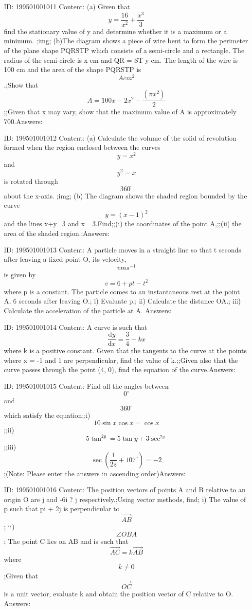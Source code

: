 \documentclass{article}
\begin{document}
ID: 199501001011
Content:
(a) Given that\[y = \frac{16}{x^{2}} + \frac{x^{3}}{3}\] find the stationary value of y and determine whether it is a maximum or a minimum. ;img; (b)The diagram shows a piece of wire bent to form the perimeter of the plane shape PQRSTP which consists of a semi-circle and a rectangle. The radius of the semi-circle is x cm and QR = ST  y cm. The length of the wire is 100 cm and the area of the shape PQRSTP is \[A cm^{2}\].;Show that \[A = 100x-2x^{2}-\frac{\left ( \pi x^{2} \right )}{2}\];;Given that x may vary, show that the maximum value of A is approximately 700.Answers:

ID: 199501001012
Content:
(a)	Calculate the volume of the solid of revolution formed when the region enclosed between the curves \[y = x^{2}\] and \[y^{2}=x\]  is rotated through \[360^{\circ}\]  about the x-axis. ;img; (b) The diagram shows the shaded region bounded by the curve\[y = \left ( x-1 \right )^{2}\] and the lines x+y=3 and x =3.Find;;(i) the coordinates of the point A,;;(ii) the area of the shaded region.;Answers:

ID: 199501001013
Content:
A particle moves in a straight line so that t seconds after leaving a fixed point O, its velocity, \[v ms^{-1}\] is given by \[v=6+pt-t^{2}\] where p is a constant. The particle comes to an instantaneous rest at the point A, 6 seconds after leaving O.;
i) Evaluate p.;
ii) Calculate the distance OA.;
iii) Calculate the acceleration of the particle at A.
Answers:

ID: 199501001014
Content:
A curve is such that \[\frac{\mathrm{d} y}{\mathrm{d} x}=\frac{3}{4}-kx\] where k is a positive constant. Given that the tangents to the curve at the points where x = -1 and 1 are perpendicular, find the value of k.;;Given also that the curve passes through the point (4, 0), find the equation of the curve.Answers:

ID: 199501001015
Content:
Find all the angles between \[0^{\circ}\]and \[360^{\circ}\] which satisfy the equation;;i) \[10 \sin x \cos x = \cos x\] ;;ii) \[5\tan ^{2y}=5\tan y+3\sec ^{2y}\];;iii)	\[\sec \left ( \frac{1}{2z}+107^\circ  \right )=-2\];(Note: Please enter the answers in ascending order)Answers:

ID: 199501001016
Content:
The position vectors of points A and B relative to an origin O are j and -6i ? j respectively.;Using vector methods, find;
i) The value of p such that pi + 2j is perpendicular to \[\vec{AB}\];
ii)\[\angle OBA\];
The point C lies on AB and is such that \[\vec{AC}=k\vec{AB}\] where \[k\neq 0\];Given that \[\vec{OC}\] is a unit vector, evaluate k and obtain the position vector of C relative to O.
Answers:
\end{document}
